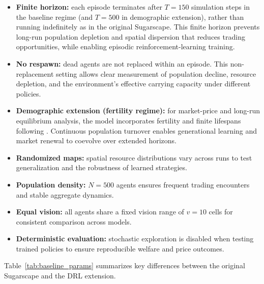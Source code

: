 \documentclass[pdflatex,sn-mathphys-num]{sn-jnl}%
\theoremstyle{thmstyleone}%
\theoremstyle{thmstyletwo}%
\theoremstyle{thmstylethree}%
\begin{document}
\begin{itemize}
    \item \textbf{Finite horizon:} each episode terminates after $T = 150$ simulation steps in the baseline regime (and $T = 500$ in demographic extension), rather than running indefinitely as in the original Sugarscape. This finite horizon prevents long-run population depletion and spatial dispersion that reduces trading opportunities, while enabling episodic reinforcement-learning training.
    
    \item \textbf{No respawn:} dead agents are not replaced within an episode. This non-replacement setting allows clear measurement of population decline, resource depletion, and the environment’s effective carrying capacity under different policies.
    
    \item \textbf{Demographic extension (fertility regime):} for market-price and long-run equilibrium analysis, the model incorporates fertility and finite lifespans following \citet{EpsteinAxtell1996}. Continuous population turnover enables generational learning and market renewal to coevolve over extended horizons.
    
    \item \textbf{Randomized maps:} spatial resource distributions vary across runs to test generalization and the robustness of learned strategies.
    
    \item \textbf{Population density:} $N = 500$ agents ensures frequent trading encounters and stable aggregate dynamics.
    
    \item \textbf{Equal vision:} all agents share a fixed vision range of $v = 10$ cells for consistent comparison across models.
    
    \item \textbf{Deterministic evaluation:} stochastic exploration is disabled when testing trained policies to ensure reproducible welfare and price outcomes.
\end{itemize}

Table~\ref{tab:baseline_params} summarizes key differences between the original Sugarscape and the DRL extension.
\end{document}

